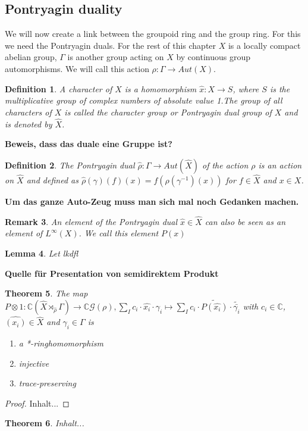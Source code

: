 \documentclass[12pt,a4paper]{scrartcl}
\newtheorem{Theorem}{Theorem}[section]
\newtheorem{Definition}[Theorem]{Definition}
\newtheorem{Lemma}[Theorem]{Lemma}
\newtheorem{Remark}[Theorem]{Remark}
\numberwithin{equation}{section}
\newcommand{\C}{\mathbb{C}} %
\newcommand{\2}{\mathbb{Z} / 2 \mathbb{Z}}
\newcommand{\G}{\mathcal{G}}
\begin{document}
\subsection{Pontryagin duality}
We will now create a link between the groupoid ring and the group ring. For this we need the Pontryagin duals. For the rest of this chapter $X$ is a locally compact abelian group, $\Gamma$ is another group acting on $X$ by continuous group automorphisms. We will call this action $\rho: \Gamma \to Aut(X)$.
\begin{Definition}
	A character of $X$ is a homomorphism $\hat{x}: X \to S$, where $S$ is the multiplicative group of complex numbers of absolute value 1.The group of all characters of $X$ is called the character group or Pontryagin dual group of $X$ and is denoted by $\hat{X}$.
\end{Definition}
\textbf{Beweis, dass das duale eine Gruppe ist?}
\begin{Definition}
	The Pontryagin dual $\hat{\rho}:\Gamma \to Aut(\hat{X})$ of the action $\rho$ is an action on $\hat{X}$ and defined as $\hat{\rho}(\gamma)(f)(x) = f(\rho(\gamma^{-1})(x))$ for $f \in \hat{X}$ and $x \in X$.
\end{Definition}
\textbf{Um das ganze Auto-Zeug muss man sich mal noch Gedanken machen.}
\begin{Remark}
	An element of the Pontryagin dual $\hat{x} \in \hat{X}$ can also be seen as an element of $L^{\infty}(X)$. We call this element $P(x)$
\end{Remark}
\begin{Lemma}
	Let lkdfl
\end{Lemma}
\textbf{Quelle für Presentation von semidirektem Produkt}
\begin{Theorem}
	The map $P \otimes 1: \C(\hat{X} \rtimes_{\hat{\rho}} \Gamma) \to \C\G(\rho), \sum_I c_i \cdot \hat{x_i} \cdot \gamma_i \mapsto \sum_I c_i \cdot \widetilde{P(\hat{x_i})} \cdot \widetilde{\bar{\gamma_i}}$ with $c_i \in \C$, $\hat{(x_i)} \in \hat{X}$ and $\gamma_i \in \Gamma$ is
	\begin{enumerate}
		\item a *-ringhomomorphism
		\item injective
		\item trace-preserving
	\end{enumerate}
\end{Theorem}
\begin{proof}
	Inhalt...
\end{proof}
\begin{Theorem}
	Inhalt...
\end{Theorem}
\end{document}

